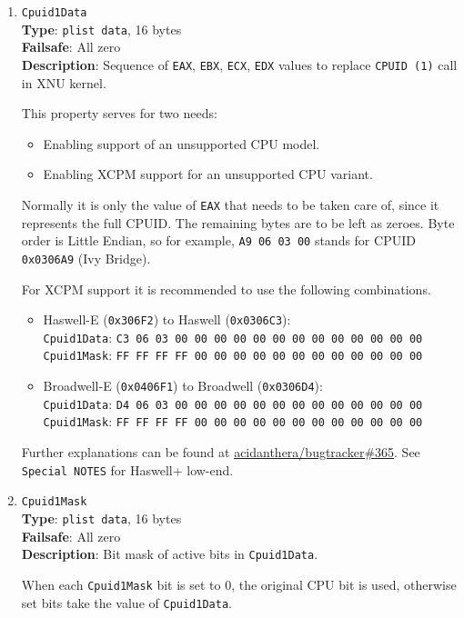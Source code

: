 \documentclass[]{article}
\providecommand{\tightlist}{%
  \setlength{\itemsep}{0pt}\setlength{\parskip}{0pt}}
\begin{document}
\begin{enumerate}
\item
  \texttt{Cpuid1Data}\\
  \textbf{Type}: \texttt{plist\ data}, 16 bytes\\
  \textbf{Failsafe}: All zero\\
  \textbf{Description}: Sequence of \texttt{EAX}, \texttt{EBX}, \texttt{ECX},
  \texttt{EDX} values to replace \texttt{CPUID (1)} call in XNU kernel.

  This property serves for two needs:

  \begin{itemize}
    \tightlist
    \item Enabling support of an unsupported CPU model.
    \item Enabling XCPM support for an unsupported CPU variant.
  \end{itemize}

  Normally it is only the value of \texttt{EAX} that needs to be taken care of,
  since it represents the full CPUID. The remaining bytes are to be left as zeroes.
  Byte order is Little Endian, so for example, \texttt{A9 06 03 00} stands for CPUID
  \texttt{0x0306A9} (Ivy Bridge).

  For XCPM support it is recommended to use the following combinations.

  \begin{itemize}
    \tightlist
    \item Haswell-E (\texttt{0x306F2}) to Haswell (\texttt{0x0306C3}):\\
    \texttt{Cpuid1Data}: \texttt{C3 06 03 00 00 00 00 00 00 00 00 00 00 00 00 00}\\
    \texttt{Cpuid1Mask}: \texttt{FF FF FF FF 00 00 00 00 00 00 00 00 00 00 00 00}
    \item Broadwell-E (\texttt{0x0406F1}) to Broadwell (\texttt{0x0306D4}):\\
    \texttt{Cpuid1Data}: \texttt{D4 06 03 00 00 00 00 00 00 00 00 00 00 00 00 00}\\
    \texttt{Cpuid1Mask}: \texttt{FF FF FF FF 00 00 00 00 00 00 00 00 00 00 00 00}
  \end{itemize}

  Further explanations can be found at
  \href{https://github.com/acidanthera/bugtracker/issues/365}{acidanthera/bugtracker\#365}.
  See \texttt{Special NOTES} for Haswell+ low-end.

\item
  \texttt{Cpuid1Mask}\\
  \textbf{Type}: \texttt{plist\ data}, 16 bytes\\
  \textbf{Failsafe}: All zero\\
  \textbf{Description}: Bit mask of active bits in \texttt{Cpuid1Data}.

  When each \texttt{Cpuid1Mask} bit is set to 0, the original CPU bit is used,
  otherwise set bits take the value of \texttt{Cpuid1Data}.

\end{enumerate}
\end{document}
